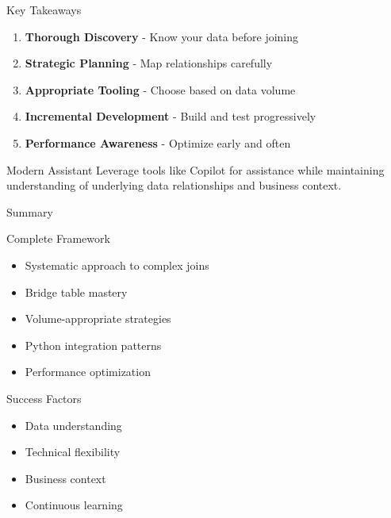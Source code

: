 \documentclass{beamer}
\begin{document}
	\begin{frame}{Key Takeaways}
		\begin{enumerate}
			\item \textbf{Thorough Discovery} - Know your data before joining
			\item \textbf{Strategic Planning} - Map relationships carefully
			\item \textbf{Appropriate Tooling} - Choose based on data volume
			\item \textbf{Incremental Development} - Build and test progressively
			\item \textbf{Performance Awareness} - Optimize early and often
		\end{enumerate}
		\vspace{0.5cm}
		\begin{exampleblock}{Modern Assistant}
			Leverage tools like Copilot for assistance while maintaining understanding of underlying data relationships and business context.
		\end{exampleblock}
	\end{frame}
	
	\begin{frame}{Summary}
		\begin{block}{Complete Framework}
			\begin{itemize}
				\item Systematic approach to complex joins
				\item Bridge table mastery
				\item Volume-appropriate strategies
				\item Python integration patterns
				\item Performance optimization
			\end{itemize}
		\end{block}
		\vspace{0.3cm}
		\begin{alertblock}{Success Factors}
			\begin{itemize}
				\item Data understanding
				\item Technical flexibility
				\item Business context
				\item Continuous learning
			\end{itemize}
		\end{alertblock}
	\end{frame}
	
\end{document}
